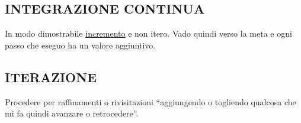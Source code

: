 		\subsection{INTEGRAZIONE CONTINUA}  \label{integrazione}
		In modo dimostrabile \underline{\hyperref[incremento]{incremento}} e non itero. Vado quindi verso la meta e ogni passo che eseguo ha un valore aggiuntivo.


		\subsection{ITERAZIONE}  \label{iterazione}
		Procedere per raffinamenti o rivisitazioni ``aggiungendo o togliendo qualcosa che mi fa quindi avanzare o retrocedere''.

